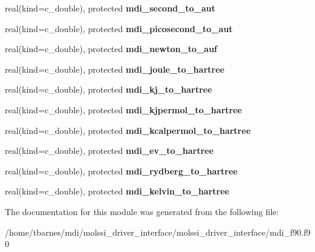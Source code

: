 \begin{DoxyCompactItemize}
\item 
\hypertarget{classmdi_aed2af8a16a8cb79135a8998326f288eb}{real(kind=c\-\_\-double), protected {\bfseries mdi\-\_\-second\-\_\-to\-\_\-aut}}\label{classmdi_aed2af8a16a8cb79135a8998326f288eb}

\item 
\hypertarget{classmdi_a9ccfec3fa70a29c0e688945503c15aee}{real(kind=c\-\_\-double), protected {\bfseries mdi\-\_\-picosecond\-\_\-to\-\_\-aut}}\label{classmdi_a9ccfec3fa70a29c0e688945503c15aee}

\item 
\hypertarget{classmdi_a505bfc3bd5ffc77b7b7e7d51bb1b2570}{real(kind=c\-\_\-double), protected {\bfseries mdi\-\_\-newton\-\_\-to\-\_\-auf}}\label{classmdi_a505bfc3bd5ffc77b7b7e7d51bb1b2570}

\item 
\hypertarget{classmdi_ad8f5371595d43c99ff92c405abe6bbc5}{real(kind=c\-\_\-double), protected {\bfseries mdi\-\_\-joule\-\_\-to\-\_\-hartree}}\label{classmdi_ad8f5371595d43c99ff92c405abe6bbc5}

\item 
\hypertarget{classmdi_af0383653d855c0cfe9fe3d02543a8a24}{real(kind=c\-\_\-double), protected {\bfseries mdi\-\_\-kj\-\_\-to\-\_\-hartree}}\label{classmdi_af0383653d855c0cfe9fe3d02543a8a24}

\item 
\hypertarget{classmdi_aa350b4ca3fdf524621eeff6ad406907b}{real(kind=c\-\_\-double), protected {\bfseries mdi\-\_\-kjpermol\-\_\-to\-\_\-hartree}}\label{classmdi_aa350b4ca3fdf524621eeff6ad406907b}

\item 
\hypertarget{classmdi_a35a22fbf5dd528f6c325d1a78232c22c}{real(kind=c\-\_\-double), protected {\bfseries mdi\-\_\-kcalpermol\-\_\-to\-\_\-hartree}}\label{classmdi_a35a22fbf5dd528f6c325d1a78232c22c}

\item 
\hypertarget{classmdi_ab1024396911608751492a2283a94bd65}{real(kind=c\-\_\-double), protected {\bfseries mdi\-\_\-ev\-\_\-to\-\_\-hartree}}\label{classmdi_ab1024396911608751492a2283a94bd65}

\item 
\hypertarget{classmdi_ae8e40ef3112f495d4a85108715c88395}{real(kind=c\-\_\-double), protected {\bfseries mdi\-\_\-rydberg\-\_\-to\-\_\-hartree}}\label{classmdi_ae8e40ef3112f495d4a85108715c88395}

\item 
\hypertarget{classmdi_ace39b5ca0b7b69166069899231fa4aaf}{real(kind=c\-\_\-double), protected {\bfseries mdi\-\_\-kelvin\-\_\-to\-\_\-hartree}}\label{classmdi_ace39b5ca0b7b69166069899231fa4aaf}

\end{DoxyCompactItemize}


The documentation for this module was generated from the following file\-:\begin{DoxyCompactItemize}
\item 
/home/tbarnes/mdi/molssi\-\_\-driver\-\_\-interface/molssi\-\_\-driver\-\_\-interface/mdi\-\_\-f90.\-f90\end{DoxyCompactItemize}

